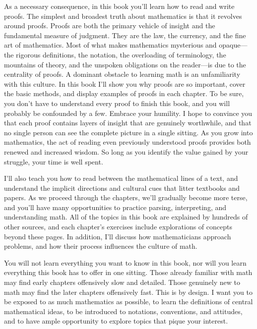 As a necessary consequence, in this book you'll learn how to read and write
proofs. The simplest and broadest truth about mathematics is that it revolves
around proofs. Proofs are both the primary vehicle of insight and the
fundamental measure of judgment. They are the law, the currency, and the fine
art of mathematics. Most of what makes mathematics mysterious and opaque---the
rigorous definitions, the notation, the overloading of terminology, the
mountains of theory, and the unspoken obligations on the reader---is due to the
centrality of proofs. A dominant obstacle to learning math is an unfamiliarity
with this culture.  In this book I'll show you why proofs are so important,
cover the basic methods, and display examples of proofs in each chapter. To be
sure, you don't have to understand every proof to finish this book, and you
will probably be confounded by a few. Embrace your humility. I hope to convince
you that each proof contains layers of insight that are genuinely worthwhile,
and that no single person can see the complete picture in a single sitting.  As
you grow into mathematics, the act of reading even previously understood proofs
provides both renewed and increased wisdom. So long as you identify the value
gained by your struggle, your time is well spent.

I'll also teach you how to read between the mathematical lines of a text, and
understand the implicit directions and cultural cues that litter textbooks and
papers. As we proceed through the chapters, we'll gradually become more terse,
and you'll have many opportunities to practice parsing, interpreting, and
understanding math. All of the topics in this book are explained by hundreds of
other sources, and each chapter's exercises include explorations of concepts
beyond these pages. In addition, I'll discuss how mathematicians approach
problems, and how their process influences the culture of math.

You will not learn everything you want to know in this book, nor will you learn
everything this book has to offer in one sitting. Those already familiar with
math may find early chapters offensively slow and detailed. Those genuinely new
to math may find the later chapters offensively fast. This is by design. I want
you to be exposed to as much mathematics as possible, to learn the definitions
of central mathematical ideas, to be introduced to notations, conventions, and
attitudes, and to have ample opportunity to explore topics that pique your
interest.

